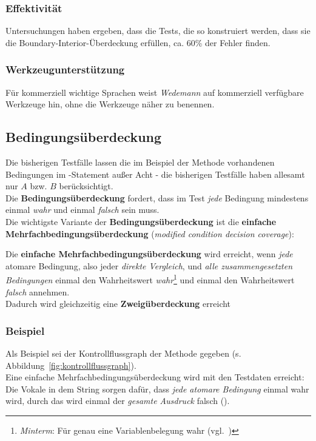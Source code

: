 \subsubsection*{Effektivität}
Untersuchungen haben ergeben, dass die Tests, die so konstruiert werden, dass sie die Boundary-Interior-Überdeckung erfüllen, ca. 60\% der Fehler finden.

\subsubsection*{Werkzeugunterstützung}
Für kommerziell wichtige Sprachen weist \textit{Wedemann} auf kommerziell verfügbare Werkzeuge hin, ohne die Werkzeuge näher zu benennen.

\subsection{Bedingungsüberdeckung}
Die bisherigen Testfälle lassen die im Beispiel der Methode  vorhandenen Bedingungen im -Statement außer Acht - die bisherigen Testfälle haben allesamt nur $A$ bzw. $B$ berücksichtigt.\\
Die \textbf{Bedingungsüberdeckung} fordert, dass im Test \textit{jede} Bedingung mindestens einmal \textit{wahr} und einmal \textit{falsch} sein muss.\\
Die wichtigste Variante der \textbf{Bedingungsüberdeckung} ist die \textbf{einfache Mehrfachbedingungsüberdeckung} (\textit{modified condition decision coverage}):

\begin{tcolorbox}[title=Einfache Mehrfachbedingungsüberdeckung]
Die \textbf{einfache Mehrfachbedingungsüberdeckung} wird erreicht, wenn \textit{jede} atomare Bedingung, also jeder \textit{direkte Vergleich}, und \textit{alle zusammengesetzten Bedingungen} einmal den Wahrheitswert \textit{wahr}\footnote{
\textit{Minterm}: Für genau eine Variablenbelegung wahr (vgl.~\cite[92]{Hof22})
} und einmal den Wahrheitswert \textit{falsch} annehmen.\\
    Dadurch wird gleichzeitig eine \textbf{Zweigüberdeckung} erreicht
\end{tcolorbox}

\subsubsection*{Beispiel}
Als Beispiel sei der Kontrollflussgraph der Methode  gegeben (s. Abbildung~\ref{fig:kontrollflussgraph}).\\
Eine einfache Mehrfachbedingungsüberdeckung wird mit den Testdaten  erreicht: Die Vokale in dem String sorgen dafür, dass \textit{jede atomare Bedingung} einmal wahr wird, durch das  wird einmal der \textit{gesamte Ausdruck} falsch ().

